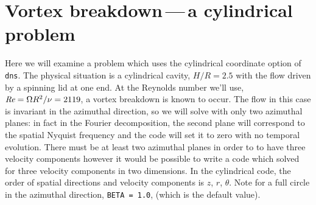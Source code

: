 \documentclass[11pt,a4paper]{report}
\def\Rey{\mbox{\it Re}}                             %
\begin{document}
\section{Vortex breakdown\,---\,a cylindrical problem}

Here we will examine a problem which uses the cylindrical coordinate
option of \verb+dns+.  The physical situation is a cylindrical cavity,
$H/R=2.5$ with the flow driven by a spinning lid at one end.  At the
Reynolds number we'll use, $\Rey=\Omega R^2/\nu=2119$, a vortex
breakdown is known to occur.  The flow in this case is invariant in
the azimuthal direction, so we will solve with only two azimuthal
planes: in fact in the Fourier decomposition, the second plane will
correspond to the spatial Nyquist frequency and the code will set it
to zero with no temporal evolution.  There must be at least two
azimuthal planes in order to to have three velocity components however
it would be possible to write a code which solved for three velocity
components in two dimensions.  In the cylindrical code, the order of
spatial directions and velocity components is $z$, $r$, $\theta$.
Note for a full circle in the azimuthal direction, \texttt{BETA =
1.0}, (which is the default value).
\end{document}
